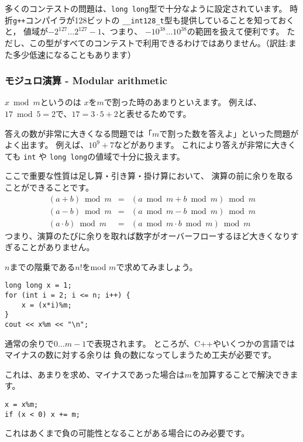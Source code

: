 多くのコンテストの問題は、\texttt{long long}型で十分なように設定されています。
時折\texttt{g++}コンパイラが128ビットの \texttt{\_\_int128\_t}型も提供していることを知っておくと，
値域が$-2^{127} \ldots 2^{127}-1$、つまり、 $-10^{38} \ldots 10^{38}$の範囲を扱えて便利です。
ただし、この型がすべてのコンテストで利用できるわけではありません。（訳註:また多少低速になることもあります）

\subsubsection{モジュロ演算 - Modular arithmetic}


$x \bmod m$というのは
$x$を$m$で割った時のあまりといえます。
例えば、$17 \bmod 5 = 2$で、$17 = 3 \cdot 5 + 2$と表せるためです。

答えの数が非常に大きくなる問題では「$m$で割った数を答えよ」といった問題がよく出ます。
例えば、$10^9+7$などがあります。
これにより答えが非常に大きくても
\texttt{int} や \texttt{long long}の値域で十分に扱えます。

ここで重要な性質は足し算・引き算・掛け算において、
演算の前に余りを取ることができることです。
\[
\begin{array}{rcr}
(a+b) \bmod m & = & (a \bmod m + b \bmod m) \bmod m \\
(a-b) \bmod m & = & (a \bmod m - b \bmod m) \bmod m \\
(a \cdot b) \bmod m & = & (a \bmod m \cdot b \bmod m) \bmod m
\end{array}
\]
つまり、演算のたびに余りを取れば数字がオーバーフローするほど大きくなりすぎることがありません。

$n$までの階乗である$n!$をmod $m$で求めてみましょう。
\begin{lstlisting}
long long x = 1;
for (int i = 2; i <= n; i++) {
    x = (x*i)%m;
}
cout << x%m << "\n";
\end{lstlisting}

通常の余りで$0\ldots m-1$で表現されます。
ところが、C++やいくつかの言語ではマイナスの数に対する余りは
負の数になってしまうため工夫が必要です。

これは、あまりを求め、マイナスであった場合は$m$を加算することで解決できます。
\begin{lstlisting}
x = x%m;
if (x < 0) x += m;
\end{lstlisting}
これはあくまで負の可能性となることがある場合にのみ必要です。


